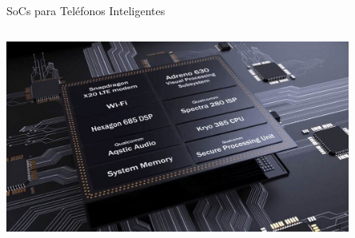 \begin{frame}{SoCs para Teléfonos Inteligentes}
\begin{columns}
\begin{column}{0.40\textwidth}
\begin{center}
\includegraphics[width=0.85\textwidth]{Figs/Snapdragon-855-1}
     \end{center}
\end{column}
\end{columns}
\end{frame}



